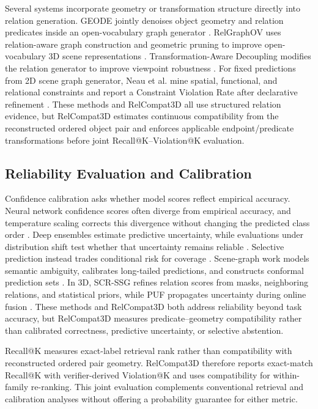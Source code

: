 Several systems incorporate geometry or transformation structure directly into relation generation. GEODE jointly denoises object geometry and relation predicates inside an open-vocabulary graph generator \cite{feng2026geode}. RelGraphOV uses relation-aware graph construction and geometric pruning to improve open-vocabulary 3D scene representations \cite{chen2026beyond}. Transformation-Aware Decoupling modifies the relation generator to improve viewpoint robustness \cite{sun2026not}. For fixed predictions from 2D scene graph generator, Neau et al. mine spatial, functional, and relational constraints and report a Constraint Violation Rate after declarative refinement \cite{neau2026visual}. These methods and RelCompat3D all use structured relation evidence, but RelCompat3D estimates continuous compatibility from the reconstructed ordered object pair and enforces applicable endpoint/predicate transformations before joint Recall@K--Violation@K evaluation. 

\subsection{Reliability Evaluation and Calibration}
Confidence calibration asks whether model scores reflect empirical accuracy. Neural network confidence scores often diverge from empirical accuracy, and temperature scaling corrects this divergence without changing the predicted class order \cite{guo2017calibration}. Deep ensembles estimate predictive uncertainty, while evaluations under distribution shift test whether that uncertainty remains reliable \cite{lakshminarayanan2017simple,ovadia2019can}. Selective prediction instead trades conditional risk for coverage \cite{geifman2017selective}. Scene-graph work models semantic ambiguity, calibrates long-tailed predictions, and constructs conformal prediction sets \cite{yang2021probabilistic,zhu2024calibration,nag2025conformal}. In 3D, SCR-SSG refines relation scores from masks, neighboring relations, and statistical priors, while PUF propagates uncertainty during online fusion \cite{yeo2025statistical,yang2026puf}. These methods and RelCompat3D both address reliability beyond task accuracy, but RelCompat3D measures predicate--geometry compatibility rather than calibrated correctness, predictive uncertainty, or selective abstention.

Recall@K measures exact-label retrieval rank rather than compatibility with reconstructed ordered pair geometry. RelCompat3D therefore reports exact-match Recall@K with verifier-derived Violation@K and uses compatibility for within-family re-ranking. This joint evaluation complements conventional retrieval and calibration analyses without offering a probability guarantee for either metric.


